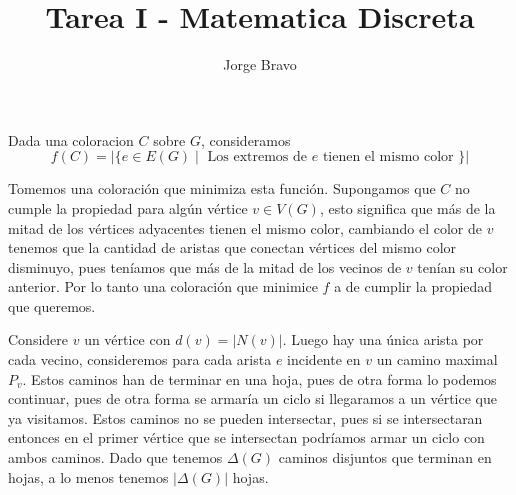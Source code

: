 \documentclass[a4paper,oneside,10.5pt]{USMArt}
\title{Tarea I - Matematica Discreta}
\author{Jorge Bravo}
\begin{document}
\maketitle

\begin{sol}
  Dada una coloracion $C$ sobre $G$, consideramos
  \begin{equation*}
    f(C) = |\{ e \in E(G) \; | \; \text{ Los extremos de } e \text{ tienen el mismo color }\}|
  \end{equation*}

  Tomemos una coloración que minimiza esta función. Supongamos que $C$ no cumple la propiedad para algún vértice
  $v \in V(G)$, esto significa que m\'as de la mitad de los vértices adyacentes tienen el mismo color, cambiando
  el color de $v$ tenemos que la cantidad de aristas que conectan vértices del mismo color disminuyo, pues teníamos
  que m\'as de la mitad de los vecinos de $v$ tenían su color anterior. Por lo tanto una coloración que minimice
  $f$ a de cumplir la propiedad que queremos.
\end{sol}

\begin{sol}
  Considere $v$ un vértice con $d(v) = |N(v)|$. Luego hay una única arista por cada vecino, consideremos para cada
  arista $e$ incidente en $v$ un camino maximal $P_{v}$. Estos caminos han de terminar en una hoja, pues de
  otra forma lo podemos continuar, pues de otra forma se armaría un ciclo si llegaramos a un vértice que ya visitamos.
  Estos caminos no se pueden intersectar, pues si se intersectaran entonces en el primer vértice que se intersectan
  podríamos armar un ciclo con ambos caminos. Dado que tenemos $\Delta(G)$ caminos disjuntos que terminan en hojas,
  a lo menos tenemos $|\Delta(G)|$ hojas.
\end{sol}
\end{document}
